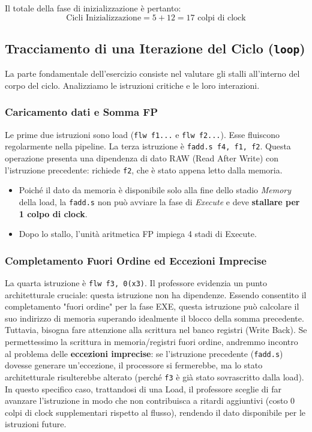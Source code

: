 Il totale della fase di inizializzazione è pertanto:
\[ \text{Cicli Inizializzazione} = 5 + 12 = 17 \text{ colpi di clock} \]

\subsection{Tracciamento di una Iterazione del Ciclo (\texttt{loop})}
La parte fondamentale dell'esercizio consiste nel valutare gli stalli all'interno del corpo del ciclo. Analizziamo le istruzioni critiche e le loro interazioni.

\subsubsection{Caricamento dati e Somma FP}
Le prime due istruzioni sono load (\texttt{flw f1...} e \texttt{flw f2...}). Esse fluiscono regolarmente nella pipeline.
La terza istruzione è \texttt{fadd.s f4, f1, f2}. Questa operazione presenta una dipendenza di dato RAW (Read After Write) con l'istruzione precedente: richiede \texttt{f2}, che è stato appena letto dalla memoria. 
\begin{itemize}
    \item Poiché il dato da memoria è disponibile solo alla fine dello stadio \textit{Memory} della load, la \texttt{fadd.s} non può avviare la fase di \textit{Execute} e deve \textbf{stallare per 1 colpo di clock}.
    \item Dopo lo stallo, l'unità aritmetica FP impiega 4 stadi di Execute.
\end{itemize}

\subsubsection{Completamento Fuori Ordine ed Eccezioni Imprecise}
La quarta istruzione è \texttt{flw f3, 0(x3)}. Il professore evidenzia un punto architetturale cruciale: questa istruzione non ha dipendenze. Essendo consentito il completamento "fuori ordine" per la fase EXE, questa istruzione può calcolare il suo indirizzo di memoria superando idealmente il blocco della somma precedente.
Tuttavia, bisogna fare attenzione alla scrittura nel banco registri (Write Back). Se permettessimo la scrittura in memoria/registri fuori ordine, andremmo incontro al problema delle \textbf{eccezioni imprecise}: se l'istruzione precedente (\texttt{fadd.s}) dovesse generare un'eccezione, il processore si fermerebbe, ma lo stato architetturale risulterebbe alterato (perché \texttt{f3} è già stato sovrascritto dalla load). In questo specifico caso, trattandosi di una Load, il professore sceglie di far avanzare l'istruzione in modo che non contribuisca a ritardi aggiuntivi (costo 0 colpi di clock supplementari rispetto al flusso), rendendo il dato disponibile per le istruzioni future.

